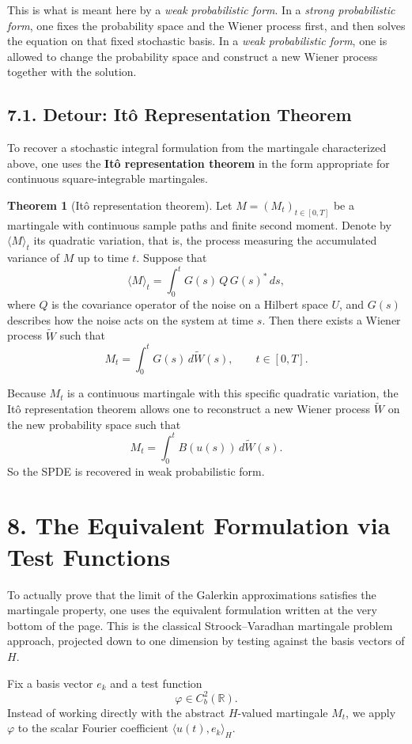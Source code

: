 \documentclass[11pt]{article}
\theoremstyle{definition}
\newtheorem{theorem}{Theorem}
\theoremstyle{remark}
\begin{document}
This is what is meant here by a \emph{weak probabilistic form}. In a \emph{strong probabilistic form}, one fixes the probability space and the Wiener process first, and then solves the equation on that fixed stochastic basis. In a \emph{weak probabilistic form}, one is allowed to change the probability space and construct a new Wiener process together with the solution.

\subsection*{7.1. Detour: It\^o Representation Theorem}
To recover a stochastic integral formulation from the martingale characterized above, one uses the \textbf{It\^o representation theorem} in the form appropriate for continuous square-integrable martingales.

\begin{theorem}[It\^o representation theorem]
Let $M=(M_t)_{t\in[0,T]}$ be a martingale with continuous sample paths and finite second moment. Denote by $\langle M\rangle_t$ its quadratic variation, that is, the process measuring the accumulated variance of $M$ up to time $t$. Suppose that
\[
  \langle M\rangle_t=\int_0^t G(s)\,Q\,G(s)^*\,ds,
\]
where $Q$ is the covariance operator of the noise on a Hilbert space $U$, and $G(s)$ describes how the noise acts on the system at time $s$. Then there exists a Wiener process $\widetilde W$ such that
\[
  M_t=\int_0^t G(s)\,d\widetilde W(s),
  \qquad t\in[0,T].
\]
\end{theorem}

Because $M_t$ is a continuous martingale with this specific quadratic variation, the It\^o representation theorem allows one to reconstruct a new Wiener process $\widetilde W$ on the new probability space such that
\[
  M_t=\int_0^t B(u(s))\,d\widetilde W(s).
\]
So the SPDE is recovered in weak probabilistic form.

\section*{8. The Equivalent Formulation via Test Functions}
To actually prove that the limit of the Galerkin approximations satisfies the martingale property, one uses the equivalent formulation written at the very bottom of the page. This is the classical Stroock--Varadhan martingale problem approach, projected down to one dimension by testing against the basis vectors of $H$.

Fix a basis vector $e_k$ and a test function
\[
  \varphi\in C_b^2(\mathbb{R}).
\]
Instead of working directly with the abstract $H$-valued martingale $M_t$, we apply $\varphi$ to the scalar Fourier coefficient $\langle u(t),e_k\rangle_H$.
\end{document}
